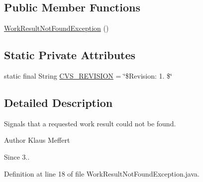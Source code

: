 \subsection*{Public Member Functions}
\begin{DoxyCompactItemize}
\item 
\hyperlink{classorg_1_1jgap_1_1distr_1_1grid_1_1common_1_1_work_result_not_found_exception_a88a6197c0f5ab006a027d77e1e8b1ed0}{Work\-Result\-Not\-Found\-Exception} ()
\end{DoxyCompactItemize}
\subsection*{Static Private Attributes}
\begin{DoxyCompactItemize}
\item 
static final String \hyperlink{classorg_1_1jgap_1_1distr_1_1grid_1_1common_1_1_work_result_not_found_exception_a1264a9bcde55d082e7296d5f0e8b2fad}{C\-V\-S\-\_\-\-R\-E\-V\-I\-S\-I\-O\-N} = \char`\"{}\$Revision\-: 1. \$\char`\"{}
\end{DoxyCompactItemize}


\subsection{Detailed Description}
Signals that a requested work result could not be found.

\begin{DoxyAuthor}{Author}
Klaus Meffert 
\end{DoxyAuthor}
\begin{DoxySince}{Since}
3.. 
\end{DoxySince}


Definition at line 18 of file Work\-Result\-Not\-Found\-Exception.\-java.



